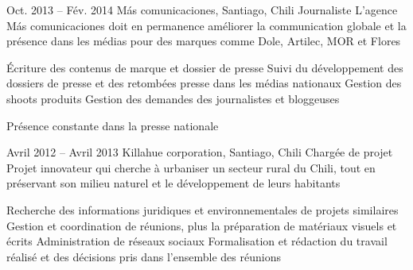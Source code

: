 \documentclass[30pt, french]{tccv}
\begin{document}
\begin{upshape}
\begin{experience}
\setlength{\parskip}{0pt}    
\item{Oct. 2013 -- Fév. 2014 }     
  {Más comunicaciones, Santiago, Chili}     
  {Journaliste}
     \fontsize{9pt}{1em}\color{text}\bodyfontlight\upshape\selectfont
%    
 L’agence Más comunicaciones doit en permanence améliorer la communication globale et la présence dans les médias
pour des marques comme Dole, Artilec, MOR et Flores\\

\setlength{\parskip}{-10pt}
\begin{itemize}
      \setlength\itemsep{-3pt} 
      \cvitem[\checkmark]  Écriture des contenus de marque et dossier de presse                                        
      \cvitem[\checkmark]  Suivi du développement des dossiers de presse et des retombées presse dans les médias nationaux                                             
      \cvitem[\checkmark]  Gestion des shoots produits 
      \cvitem[\checkmark]  Gestion des demandes des journalistes et bloggeuses 

\end{itemize}       
 Présence constante dans la presse nationale
\vspace{0.5cm}




\setlength{\parskip}{0pt}
\item{Avril 2012 -- Avril 2013 }     
  {Killahue corporation, Santiago, Chili}     
  {Chargée de projet}
\fontsize{9pt}{1em}\color{text}\bodyfontlight\upshape\selectfont
%
 Projet innovateur qui cherche à urbaniser un secteur rural du Chili, tout en préservant son milieu naturel et le développement de leurs habitants \\
     
\setlength{\parskip}{-10pt}
\begin{itemize}
      \setlength\itemsep{-3pt} 
      \cvitem[\checkmark] Recherche des informations juridiques et environnementales de projets similaires          
      \cvitem[\checkmark] Gestion et coordination de réunions, plus la préparation de matériaux visuels et écrits   
      \cvitem[\checkmark] Administration de réseaux sociaux                                                                    
      \cvitem[\checkmark] Formalisation et rédaction du travail réalisé et des décisions pris dans l’ensemble des réunions     
\end{itemize}      


\end{experience}
\end{upshape}
\end{document}
